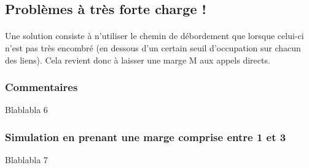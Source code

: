         \subsection{Problèmes à très forte charge !}
            \paragraph{}
Une solution consiste à n'utiliser le chemin de débordement que lorsque celui-ci n'est pas très encombré (en dessous d'un certain seuil d'occupation sur chacun des liens).
Cela revient donc à laisser une marge M aux appels directs.
%
            \subsubsection{Commentaires}
Blablabla 6
%
            \subsubsection{Simulation en prenant une marge comprise entre 1 et 3}
Blablabla 7

%
    \clearpage
%
